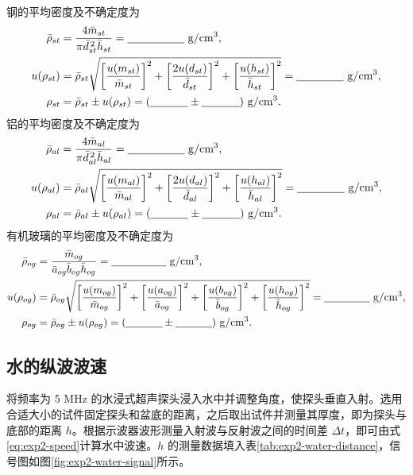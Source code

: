\documentclass[UTF8,a4paper,12pt]{ctexart}
\newcommand{\blank}[1][2.5cm]{\mbox{\underline{\hspace{#1}}}}
\numberwithin{equation}{section}
\begin{document}
钢的平均密度及不确定度为
\begin{align}
  \bar{\rho}_{st}&=\frac{4\bar{m}_{st}}{\pi\bar{d}_{st}^{\,2}\bar{h}_{st}}
  =\blank[1.8cm]\ \mathrm{g/cm^3},\\
  u(\rho_{st})&=\bar{\rho}_{st}\sqrt{
  \left[\frac{u(m_{st})}{\bar{m}_{st}}\right]^2+
  \left[\frac{2u(d_{st})}{\bar{d}_{st}}\right]^2+
  \left[\frac{u(h_{st})}{\bar{h}_{st}}\right]^2}
  =\blank[1.5cm]\ \mathrm{g/cm^3},\\
  \rho_{st}&=\bar{\rho}_{st}\pm u(\rho_{st})
  =(\blank[1.2cm]\pm\blank[1.2cm])\ \mathrm{g/cm^3}.
\end{align}
铝的平均密度及不确定度为
\begin{align}
  \bar{\rho}_{al}&=\frac{4\bar{m}_{al}}{\pi\bar{d}_{al}^{\,2}\bar{h}_{al}}
  =\blank[1.8cm]\ \mathrm{g/cm^3},\\
  u(\rho_{al})&=\bar{\rho}_{al}\sqrt{
  \left[\frac{u(m_{al})}{\bar{m}_{al}}\right]^2+
  \left[\frac{2u(d_{al})}{\bar{d}_{al}}\right]^2+
  \left[\frac{u(h_{al})}{\bar{h}_{al}}\right]^2}
  =\blank[1.5cm]\ \mathrm{g/cm^3},\\
  \rho_{al}&=\bar{\rho}_{al}\pm u(\rho_{al})
  =(\blank[1.2cm]\pm\blank[1.2cm])\ \mathrm{g/cm^3}.
\end{align}
有机玻璃的平均密度及不确定度为
\begin{align}
  \bar{\rho}_{og}&=\frac{\bar{m}_{og}}{\bar{a}_{og}\bar{b}_{og}\bar{h}_{og}}
  =\blank[1.8cm]\ \mathrm{g/cm^3},\\
  u(\rho_{og})&=\bar{\rho}_{og}\sqrt{
  \left[\frac{u(m_{og})}{\bar{m}_{og}}\right]^2+
  \left[\frac{u(a_{og})}{\bar{a}_{og}}\right]^2+
  \left[\frac{u(b_{og})}{\bar{b}_{og}}\right]^2+
  \left[\frac{u(h_{og})}{\bar{h}_{og}}\right]^2}
  =\blank[1.5cm]\ \mathrm{g/cm^3},\\
  \rho_{og}&=\bar{\rho}_{og}\pm u(\rho_{og})
  =(\blank[1.2cm]\pm\blank[1.2cm])\ \mathrm{g/cm^3}.
\end{align}

\subsection{水的纵波波速}
将频率为 5 MHz 的水浸式超声探头浸入水中并调整角度，使探头垂直入射。选用合适大小的试件固定探头和盆底的距离，之后取出试件并测量其厚度，即为探头与底部的距离 $h$。根据示波器波形测量入射波与反射波之间的时间差 $\Delta t$，即可由式\eqref{eq:exp2-speed}计算水中波速。$h$ 的测量数据填入表\ref{tab:exp2-water-distance}，信号图如图\ref{fig:exp2-water-signal}所示。
\end{document}
